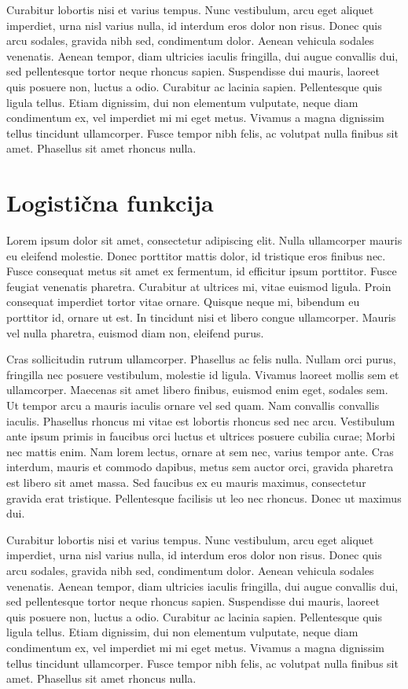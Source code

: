 \documentclass{isrmdelo}
\begin{document}
Curabitur lobortis nisi et varius tempus. Nunc vestibulum, arcu eget aliquet imperdiet, urna nisl varius nulla, id interdum eros dolor non risus. Donec quis arcu sodales, gravida nibh sed, condimentum dolor. Aenean vehicula sodales venenatis. Aenean tempor, diam ultricies iaculis fringilla, dui augue convallis dui, sed pellentesque tortor neque rhoncus sapien. Suspendisse dui mauris, laoreet quis posuere non, luctus a odio. Curabitur ac lacinia sapien. Pellentesque quis ligula tellus. Etiam dignissim, dui non elementum vulputate, neque diam condimentum ex, vel imperdiet mi mi eget metus. Vivamus a magna dignissim tellus tincidunt ullamcorper. Fusce tempor nibh felis, ac volutpat nulla finibus sit amet. Phasellus sit amet rhoncus nulla. 

\chapter{Logistična funkcija}

Lorem ipsum dolor sit amet, consectetur adipiscing elit. Nulla ullamcorper mauris eu eleifend molestie. Donec porttitor mattis dolor, id tristique eros finibus nec. Fusce consequat metus sit amet ex fermentum, id efficitur ipsum porttitor. Fusce feugiat venenatis pharetra. Curabitur at ultrices mi, vitae euismod ligula. Proin consequat imperdiet tortor vitae ornare. Quisque neque mi, bibendum eu porttitor id, ornare ut est. In tincidunt nisi et libero congue ullamcorper. Mauris vel nulla pharetra, euismod diam non, eleifend purus.

Cras sollicitudin rutrum ullamcorper. Phasellus ac felis nulla. Nullam orci purus, fringilla nec posuere vestibulum, molestie id ligula. Vivamus laoreet mollis sem et ullamcorper. Maecenas sit amet libero finibus, euismod enim eget, sodales sem. Ut tempor arcu a mauris iaculis ornare vel sed quam. Nam convallis convallis iaculis. Phasellus rhoncus mi vitae est lobortis rhoncus sed nec arcu. Vestibulum ante ipsum primis in faucibus orci luctus et ultrices posuere cubilia curae; Morbi nec mattis enim. Nam lorem lectus, ornare at sem nec, varius tempor ante. Cras interdum, mauris et commodo dapibus, metus sem auctor orci, gravida pharetra est libero sit amet massa. Sed faucibus ex eu mauris maximus, consectetur gravida erat tristique. Pellentesque facilisis ut leo nec rhoncus. Donec ut maximus dui.

Curabitur lobortis nisi et varius tempus. Nunc vestibulum, arcu eget aliquet imperdiet, urna nisl varius nulla, id interdum eros dolor non risus. Donec quis arcu sodales, gravida nibh sed, condimentum dolor. Aenean vehicula sodales venenatis. Aenean tempor, diam ultricies iaculis fringilla, dui augue convallis dui, sed pellentesque tortor neque rhoncus sapien. Suspendisse dui mauris, laoreet quis posuere non, luctus a odio. Curabitur ac lacinia sapien. Pellentesque quis ligula tellus. Etiam dignissim, dui non elementum vulputate, neque diam condimentum ex, vel imperdiet mi mi eget metus. Vivamus a magna dignissim tellus tincidunt ullamcorper. Fusce tempor nibh felis, ac volutpat nulla finibus sit amet. Phasellus sit amet rhoncus nulla. 
\end{document}
